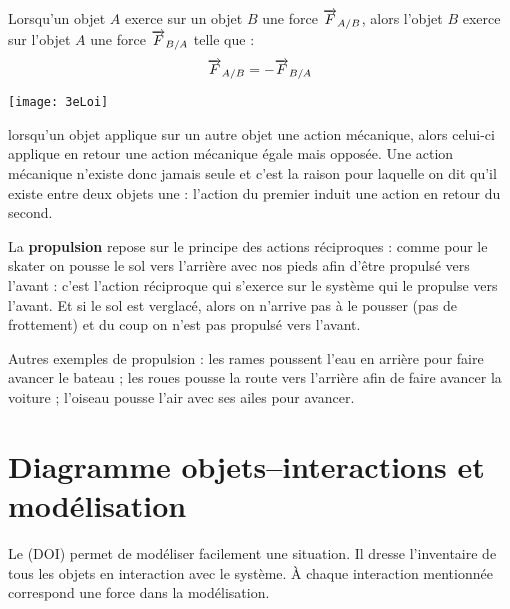 \vspace{1em}

\begin{aconnaitre}

Lorsqu'un objet $A$ exerce sur un objet $B$ une force $\overrightarrow{F}_{A/B}$, alors l'objet $B$ exerce sur l'objet $A$ une force $\overrightarrow{F}_{B/A}$ telle que : {\large\[\overrightarrow{F}_{A/B} = -\overrightarrow{F}_{B/A}\]}

\begin{center}
    \texttt{[image: 3eLoi]}
\end{center}
\end{aconnaitre}
  


\begin{remarque}
lorsqu'un objet applique sur un autre objet une action mécanique, alors celui-ci applique en retour une action mécanique égale mais opposée. Une action mécanique n'existe donc jamais seule et c'est la raison pour laquelle on dit qu'il existe entre deux objets une \textbf{} : l'action du premier induit une action en retour du second. 
\end{remarque}


La \textbf{propulsion} repose sur le principe des actions réciproques : comme pour le skater on \og pousse \fg le sol vers l'arrière avec nos pieds afin d'être propulsé vers l'avant : c'est l'action réciproque qui s'exerce sur le système qui le propulse vers l'avant. Et si le sol est verglacé, alors on n'arrive pas à le \og pousser \fg (pas de frottement) et du coup on n'est pas propulsé vers l'avant.

Autres exemples de propulsion : les rames poussent l'eau en arrière pour faire avancer le bateau ; les roues \og pousse \fg la route vers l'arrière afin de faire avancer la voiture ; l'oiseau \og pousse \fg l'air avec ses ailes pour avancer.





\section{Diagramme objets--interactions et modélisation}

Le  (DOI) permet de modéliser facilement une situation. Il dresse l'inventaire de tous les objets en interaction avec le système. À chaque interaction mentionnée correspond une force dans la modélisation.

